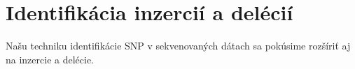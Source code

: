 \chapter{Identifikácia inzercií a delécií}

\label{kap:identifikacia_indel} %

Našu techniku identifikácie SNP v sekvenovaných
dátach sa pokúsime rozšíriť aj na inzercie a delécie.
